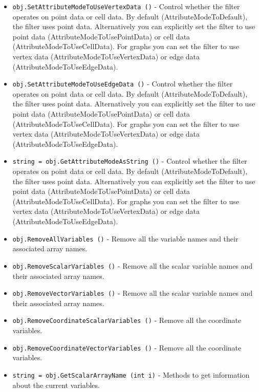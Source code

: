 \begin{itemize}
\item  \verb|obj.SetAttributeModeToUseVertexData ()| -  Control whether the filter operates on point data or cell data.
 By default (AttributeModeToDefault), the filter uses point
 data. Alternatively you can explicitly set the filter to use point data
 (AttributeModeToUsePointData) or cell data (AttributeModeToUseCellData).
 For graphs you can set the filter to use vertex data
 (AttributeModeToUseVertexData) or edge data (AttributeModeToUseEdgeData).

\item  \verb|obj.SetAttributeModeToUseEdgeData ()| -  Control whether the filter operates on point data or cell data.
 By default (AttributeModeToDefault), the filter uses point
 data. Alternatively you can explicitly set the filter to use point data
 (AttributeModeToUsePointData) or cell data (AttributeModeToUseCellData).
 For graphs you can set the filter to use vertex data
 (AttributeModeToUseVertexData) or edge data (AttributeModeToUseEdgeData).

\item  \verb|string = obj.GetAttributeModeAsString ()| -  Control whether the filter operates on point data or cell data.
 By default (AttributeModeToDefault), the filter uses point
 data. Alternatively you can explicitly set the filter to use point data
 (AttributeModeToUsePointData) or cell data (AttributeModeToUseCellData).
 For graphs you can set the filter to use vertex data
 (AttributeModeToUseVertexData) or edge data (AttributeModeToUseEdgeData).

\item  \verb|obj.RemoveAllVariables ()| -  Remove all the variable names and their associated array names.

\item  \verb|obj.RemoveScalarVariables ()| -  Remove all the scalar variable names and their associated array names.

\item  \verb|obj.RemoveVectorVariables ()| -  Remove all the scalar variable names and their associated array names.

\item  \verb|obj.RemoveCoordinateScalarVariables ()| -  Remove all the coordinate variables.

\item  \verb|obj.RemoveCoordinateVectorVariables ()| -  Remove all the coordinate variables.

\item  \verb|string = obj.GetScalarArrayName (int i)| -  Methods to get information about the current variables.


\end{itemize}
